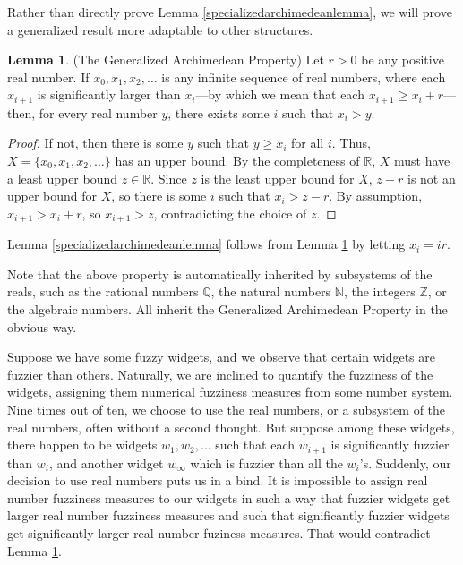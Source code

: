 \documentclass[reqno]{article}
\theoremstyle{definition}
\newtheorem{lemma}[theorem]{Lemma}
\begin{document}
Rather than directly prove Lemma \ref{specializedarchimedeanlemma},
we will prove a generalized result more adaptable
to other structures.

\begin{lemma}
\label{generalizedarchimedeanlemma}
(The Generalized Archimedean Property)
Let $r>0$ be any positive real number.
If $x_0,x_1,x_2,\ldots$ is any infinite sequence of real numbers,
where each $x_{i+1}$ is significantly larger than $x_i$---by which
we mean that each $x_{i+1}\geq x_i+r$---then, for every real number $y$,
there exists some $i$ such that $x_i>y$.
\end{lemma}

\begin{proof}
If not, then there is some $y$ such that $y\geq x_i$ for all $i$.
Thus, $X=\{x_0,x_1,x_2,\ldots\}$ has an upper bound. By the completeness
of $\mathbb R$, $X$ must have a least upper bound $z\in\mathbb R$.
Since $z$ is the least upper bound for $X$, $z-r$ is not an upper bound
for $X$, so there is some $i$ such that $x_i>z-r$.
By assumption, $x_{i+1}>x_i+r$, so $x_{i+1}>z$, contradicting the choice
of $z$.
\end{proof}

Lemma \ref{specializedarchimedeanlemma} follows from
Lemma \ref{generalizedarchimedeanlemma} by letting $x_i=ir$.

Note that the above property is automatically inherited by subsystems
of the reals, such as the rational numbers $\mathbb Q$, the natural
numbers $\mathbb N$, the integers $\mathbb Z$, or the algebraic numbers.
All inherit the Generalized Archimedean Property in the obvious way.

Suppose we have some fuzzy widgets, and we observe that certain
widgets are fuzzier than others. Naturally, we are inclined to
quantify the fuzziness of the widgets, assigning them numerical
fuzziness measures from some number system. Nine times out of ten,
we choose to use the real numbers, or a subsystem of the real numbers,
often without a second thought. But suppose
among these widgets, there happen to be widgets $w_1,w_2,\ldots$
such that each $w_{i+1}$ is significantly fuzzier than $w_i$,
and another widget $w_\infty$ which is fuzzier than all the $w_i$'s.
Suddenly, our decision to use real numbers puts us in a bind.
It is impossible to assign real number fuzziness measures to our
widgets in such a way that fuzzier widgets get larger real number
fuzziness measures and such that significantly fuzzier widgets get
significantly larger real number fuziness measures. That would
contradict Lemma \ref{generalizedarchimedeanlemma}.
\end{document}
